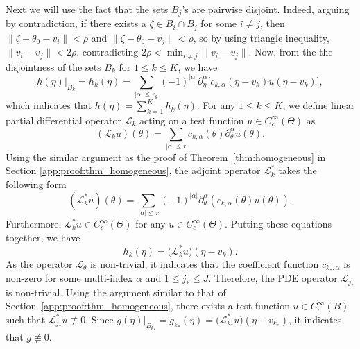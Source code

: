 \documentclass[11pt,twoside]{article} %
\begin{document}
Next we will use the fact that the sets $B_j$'s are pairwise disjoint. Indeed, arguing by contradiction, if there exists a $\zeta\in B_i\cap B_j$ for some $i\ne j$, then $\|\zeta-\theta_0-v_i\|<\rho$ and $\|\zeta-\theta_0-v_j\|<\rho$,
so by using triangle inequality, $\|v_i-v_j\|<2\rho$, contradicting $2\rho<\min_{i\ne j}\|v_i-v_j\|$. 
Now, from the the disjointness of the sets $B_{k}$ for $1 \leq k \leq K$, we have
$$h(\eta) \Big|_{B_k} = h_k(\eta) = \sum_{|\alpha| \le r_k} (-1)^{|\alpha|} \partial_\eta^\alpha \big[ c_{k, \alpha}(\eta - v_k) u(\eta - v_k) \big],$$
which indicates that $h(\eta) = \sum_{k = 1}^{K} h_{k}(\eta)$. For any $1 \leq k \leq K$, we define linear partial differential operator $\mathcal{L}_{k}$ acting on a test function $u \in C_c^\infty(\Theta)$ as
$$(\mathcal{L}_{k}u)(\theta) = \sum_{|\alpha| \le r} c_{k,\alpha}(\theta) \partial_\theta^\alpha u(\theta).$$
Using the similar argument as the proof of Theorem~\ref{thm:homogeneous} in Section \ref{app:proof:thm_homogeneous}, the adjoint operator $\mathcal{L}_{k}^*$ takes the following form $$(\mathcal{L}_{k}^* u)(\theta) = \sum_{|\alpha| \le r} (-1)^{|\alpha|} \partial_\theta^\alpha \left( c_{k,\alpha}(\theta) u(\theta) \right).$$
Furthermore, $\mathcal{L}_{k}^* u \in C_c^\infty(\Theta)$ for any $u \in C_c^\infty(\Theta)$. Putting these equations together, we have
$$h_{k}(\eta) = \big(\mathcal{L}_k^* u\big)(\eta - v_k). $$
As the operator $\mathcal{L}_{\theta}$ is non-trivial, it indicates that the coefficient function $c_{k_*, \alpha}$ is non-zero for some multi-index $\alpha$ and $1 \leq j_{*} \leq J$. Therefore, the PDE operator $\mathcal{L}_{j_{*}}$ is non-trivial. Using the argument similar to that of Section~\ref{app:proof:thm_homogeneous}, there exists a test function $u \in C_c^\infty(B)$ such that $\mathcal{L}_{j_*}^* u \not \equiv 0$. Since $g(\eta) \Big|_{B_{k_{*}}} = g_{k_{*}}(\eta) = \big(\mathcal{L}_{k_{*}}^* u\big)(\eta - v_{k_{*}})$, it indicates that $g \not \equiv 0$. 
\end{document}
